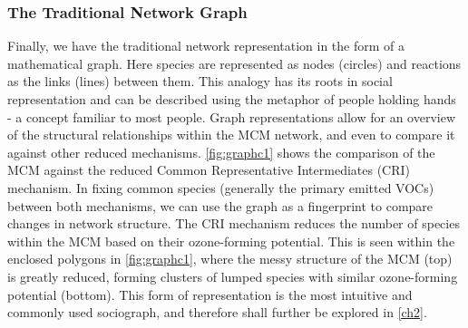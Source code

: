 %
%


\subsubsection{The Traditional Network Graph}\label{sec:tradnetconc}

Finally, we have the traditional network representation in the form of a mathematical graph. Here species are represented as nodes (circles) and reactions as the links (lines) between them. This analogy has its roots in social representation and can be described using the metaphor of people holding hands - a concept familiar to most people. Graph representations allow for an overview of the structural relationships within the MCM network, and even to compare it against other reduced mechanisms. \autoref{fig:graphc1} shows the comparison of the MCM against the reduced Common Representative Intermediates (CRI) \citep{cri} mechanism. In fixing common species (generally the primary emitted VOCs) between both mechanisms, we can use the graph as a fingerprint to compare changes in network structure. The CRI mechanism reduces the number of species within the MCM based on their ozone-forming potential. This is seen within the enclosed polygons in \autoref{fig:graphc1}, where the messy structure of the MCM (top) is greatly reduced, forming clusters of lumped species with similar ozone-forming potential (bottom). This form of representation is the most intuitive and commonly used sociograph, and therefore shall further be explored in \autoref{ch2}.



